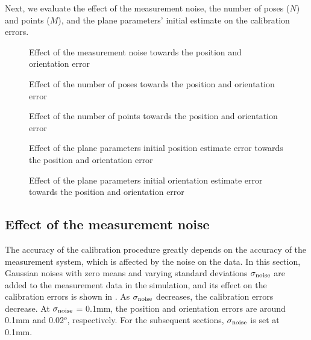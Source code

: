 Next, we evaluate the effect of the measurement noise, the number of poses ($N$) and points ($M$), and the plane parameters' initial estimate on the calibration errors. 


\begin{figure}[t]
  \centering
  \caption{Effect of the measurement noise towards the position and orientation error} 
  \label{fig:laser_noise}
\end{figure}


\begin{figure}[t]
  \centering
  \caption{Effect of the number of poses towards the position and orientation error} 
  \label{fig:num_of_poses}
\end{figure}


\begin{figure}[t]
  \centering
  \caption{Effect of the number of points towards the position and orientation error} 
  \label{fig:num_of_points}
\end{figure}

\begin{figure}[t]
  \centering
  \caption{Effect of the plane parameters initial position estimate error towards the position and orientation error} 
  \label{fig:plane_params_linear}
\end{figure}

\begin{figure}[t]
  \centering
  \caption{Effect of the plane parameters initial orientation estimate error towards the position and orientation error} 
  \label{fig:plane_params_angular}
\end{figure}




\subsection{Effect of the measurement noise}
\label{sec:meas_accuracy}
The accuracy of the calibration procedure greatly depends on the accuracy of the measurement system, which is affected by the noise on the data. In this section, Gaussian noises with zero means and varying standard deviations $\sigma_{\rm{noise}}$ are added to the measurement data in the simulation, and its effect on the calibration errors is shown in . As $\sigma_{\rm{noise}}$ decreases, the calibration errors decrease. At $\sigma_{\rm{noise}}$ = 0.1mm, the position and orientation errors are around 0.1mm and 0.02$^o$, respectively. For the subsequent sections, $\sigma_{\rm{noise}}$ is set at 0.1mm. 

